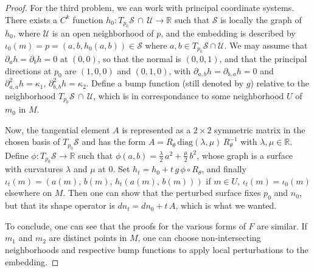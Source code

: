\documentclass[11pt]{article}
\newcommand{\R}{\mathbb{R}}
\newcommand{\io}{\iota}
\newcommand{\kap}{\kappa}
\newcommand{\inter}{\cap}
\newcommand{\Surf}{\mathcal{S}}
\theoremstyle{plain}
\theoremstyle{definition}
\theoremstyle{remark}
\begin{document}
\begin{proof}
		For the third problem, we can work with principal coordinate systems. There exists a $C^k$ function $h_0 : T_{p_0} \Surf \, \inter \, \mathcal{U} \to \R$ such that $\Surf$ is locally the graph of $h_0$, where $\mathcal{U}$ is an open neighborhood of $p$, and the embedding is described by $\io_0(m) = p = (a,b,h_0(a,b)) \in \Surf$ where $a,b \in T_{p_0} \Surf \inter \mathcal{U}$. We may assume that $\partial_a h = \partial_b h = 0$ at $(0,0)$, so that the normal is $(0,0,1)$, and that the principal directions at $p_0$ are $(1,0,0)$ and $(0,1,0)$, with $\partial_{a,b} h = \partial_{b,a} h = 0$ and $\partial^2_{a,a} h = \kap_1$, $\partial^2_{b,b} h = \kap_2$. Define a bump function (still denoted by $g$) relative to the neighborhood $T_{p_0} \Surf \, \inter \, \mathcal{U}$, which is in correspondance to some neighborhood $U$ of $m_0$ in $M$.
		
		Now, the tangential element $A$ is represented as a $2 \times 2$ symmetric matrix in the chosen basis of $T_{p_0} \Surf$ and has the form $A = R_\theta \, \mathrm{diag}(\lambda, \mu) \, R_\theta^{-1}$ with $\lambda, \mu \in \R$. Define $\phi : T_{p_0} \Surf \to \R$ such that $\phi(a,b) = \frac{\lambda}{2} \, a^2 + \frac{\mu}{2} \, b^2$, whose graph is a surface with curvatures $\lambda$ and $\mu$ at $0$. Set $h_t = h_0 + t\, g \, \phi \circ R_\theta$, and finally $\io_t(m) = (a(m),\, b(m),\, h_t(a(m),\, b(m)))$ if $m \in U$, $\io_t(m) = \io_0(m)$ elsewhere on $M$. Then one can show that the perturbed surface fixes $p_0$ and $n_0$, but that its shape operator is $dn_t = dn_0 + t \, A$, which is what we wanted.
		
		To conclude, one can see that the proofs for the various forms of $F$ are similar. If $m_1$ and $m_2$ are distinct points in $M$, one can choose non-intersecting neighborhoods and respective bump functions to apply local perturbations to the embedding.
	\end{proof}
	
\end{document}
